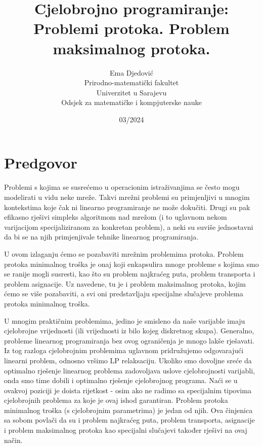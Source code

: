 \documentclass[11pt, a4paper]{article}
\title{Cjelobrojno programiranje:\\Problemi protoka. Problem maksimalnog protoka.}
\author{Ema Djedović \\
	Prirodno-matematički fakultet\\
	Univerzitet u Sarajevu\\
	Odsjek za matematičke i kompjuterske nauke\\}
\date{03/2024}
\begin{document}
	
	\maketitle
	\thispagestyle{empty}
	
	\newpage
	\tableofcontents
	\thispagestyle{empty}
	
	\newpage
	\clearpage
	
	\section*{Predgovor}
	
	Problemi s kojima se susrećemo u operacionim istraživanjima se često mogu modelirati u vidu neke mreže. Takvi mrežni problemi su primjenljivi u mnogim kontekstima koje čak ni linearno programiranje ne može dokučiti. Drugi su pak efikasno rješivi simpleks algoritmom nad mrežom (i to uglavnom nekom varijacijom specijaliziranom za konkretan problem), a neki su suviše jednostavni da bi se na njih primjenjivale tehnike linearnog programiranja.
	
	U ovom izlaganju ćemo se pozabaviti mrežnim problemima protoka. Problem protoka minimalnog troška je onaj koji enkapsulira mnoge probleme s kojima smo se ranije mogli susresti, kao što su problem najkraćeg puta, problem transporta i problem asignacije. Uz navedene, tu je i problem maksimalnog protoka, kojim ćemo se više pozabaviti, a svi oni predstavljaju specijalne slučajeve problema protoka minimalnog troška.
	
	U mnogim praktičnim problemima, jedino je smisleno da naše varijable imaju cjelobrojne vrijednosti (ili vrijednosti iz bilo kojeg diskretnog skupa). Generalno, probleme linearnog programiranja bez ovog ograničenja je mnogo lakše rješavati. Iz tog razloga cjelobrojnim problemima uglavnom pridružujemo odgovarajući linearni problem, odnosno vršimo LP relaksaciju. Ukoliko smo dovoljne sreće da optimalno rješenje linearnog problema zadovoljava uslove cjelobrojnosti varijabli, onda smo time dobili i optimalno rješenje cjelobrojnog programa. Naći se u ovakvoj poziciji je doista rijetkost - osim ako ne radimo sa specijalnim tipovima cjelobrojnih problema za koje je ovaj ishod garantiran. Problem protoka minimalnog troška (s cjelobrojnim parametrima) je jedan od njih. Ova činjenica sa sobom povlači da su i problem najkraćeg puta, problem transporta, asignacije i problem maksimalnog protoka kao specijalni slučajevi također rješivi na ovaj način.
	
\end{document}
